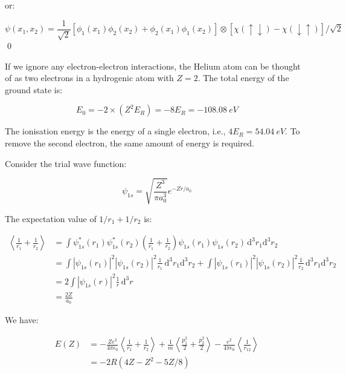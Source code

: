 \documentclass[12pt]{article}
\begin{document}
or:

\begin{equation}
    \psi(x_{1}, x_{2}) = \frac{1}{\sqrt{2}}\left[\phi_{1}(x_{1})\phi_{2}(x_{2}) + \phi_{2}(x_{1})\phi_{1}(x_{2})\right] \otimes [\chi(\uparrow \downarrow) - \chi(\downarrow \uparrow)]/\sqrt{2}
\end{equation}
\qed


If we ignore any electron-electron interactions, the Helium atom can be thought of as two electrons in a hydrogenic atom with $Z = 2$. The total energy of the ground state is:

\begin{equation}
    E_{0} = -2 \times \left( Z^{2} E_{R} \right) = -8E_{R} = \qty{-108.08}{eV}
\end{equation}

The ionisation energy is the energy of a single electron, i.e., $4E_{R} = \qty{54.04}{eV}$. To remove the second electron, the same amount of energy is required.

Consider the trial wave function:

\begin{equation}
    \psi_{1s} = \sqrt{\frac{Z^{3}}{\pi a_{0}^{3}}} e^{-Zr/a_{0}}
\end{equation}

The expectation value of $1/r_{1} + 1/r_{2}$ is:

\begin{equation}
    \begin{split}
        \left\langle \frac{1}{r_{1}} + \frac{1}{r_{2}} \right\rangle &= \int \psi_{1s}^{*}(r_{1}) \psi_{1s}^{*}(r_{2}) \left( \frac{1}{r_{1}} + \frac{1}{r_{2}} \right) \psi_{1s}(r_{1}) \psi_{1s}(r_{2}) \, \mathrm{d}^{3}r_{1} \mathrm{d}^{3}r_{2} \\
        &= \int \left\lvert \psi_{1s}(r_{1}) \right\rvert^{2} \left\lvert \psi_{1s}(r_{2}) \right\rvert^{2} \frac{1}{r_{1}} \, \mathrm{d}^{3}r_{1} \mathrm{d}^{3}r_{2} + \int \left\lvert \psi_{1s}(r_{1}) \right\rvert^{2} \left\lvert \psi_{1s}(r_{2}) \right\rvert^{2} \frac{1}{r_{2}} \, \mathrm{d}^{3}r_{1} \mathrm{d}^{3}r_{2} \\
        &= 2 \int \left\lvert \psi_{1s}(r) \right\rvert^{2} \frac{1}{r} \, \mathrm{d}^{3}r \\
        &= \frac{2Z}{a_{0}}
    \end{split}
\end{equation}

We have:

\begin{equation}
    \begin{split}
        E(Z) &= -\frac{Ze^{2}}{4\pi\epsilon_{0}} \left\langle \frac{1}{r_{1}} + \frac{1}{r_{2}} \right\rangle + \frac{1}{m} \left\langle \frac{p_{1}^{2}}{2} + \frac{p_{2}^{2}}{2} \right\rangle - \frac{e^{2}}{4\pi\epsilon_{0}} \left\langle \frac{1}{r_{12}} \right\rangle \\
        &= -2R(4Z - Z^{2} - 5Z/8)
    \end{split}
\end{equation}
\end{document}
